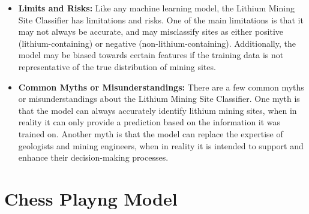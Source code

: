 \begin{itemize}
\item \textbf{Limits and Risks:} Like any machine learning model, the Lithium Mining Site Classifier has limitations and risks. One of the main limitations is that it may not always be accurate, and may misclassify sites as either positive (lithium-containing) or negative (non-lithium-containing). Additionally, the model may be biased towards certain features if the training data is not representative of the true distribution of mining sites.
\item \textbf{Common Myths or Misunderstandings:} There are a few common myths or misunderstandings about the Lithium Mining Site Classifier. One myth is that the model can always accurately identify lithium mining sites, when in reality it can only provide a prediction based on the information it was trained on. Another myth is that the model can replace the expertise of geologists and mining engineers, when in reality it is intended to support and enhance their decision-making processes.
\end{itemize}

\section{Chess Playng Model}

